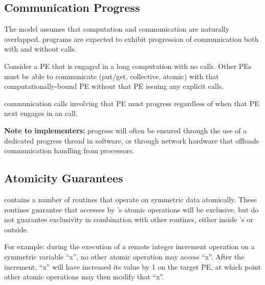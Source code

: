 \pagebreak

\subsection{Communication Progress}

The \openshmem model assumes that computation and communication are
naturally overlapped.  \openshmem programs are expected to exhibit
progression of communication both with and without \openshmem calls.

Consider a PE that is engaged in a long computation with no \openshmem calls.
Other PEs must be able to communicate (put/get,
collective, atomic) with that computationally-bound PE without that PE
issuing any explicit \openshmem calls.

\openshmem communication calls involving that PE must progress
regardless of when that PE next engages in an \openshmem call.

\textbf{Note to implementers:} progress will often be ensured through
the use of a dedicated progress thread in software, or through
network hardware that offloads communication handling from processors.

\subsection{Atomicity Guarantees}

\openshmem contains a number of routines that operate on symmetric data
atomically.  These routines guarantee that accesses by \openshmem's
atomic operations will be exclusive, but do not guarantee exclusivity
in combination with other routines, either inside \openshmem's or
outside.

For example: during the execution of a remote integer increment
operation on a symmetric variable ``x'', no other \openshmem atomic
operation may access ``x''.  After the increment, ``x'' will have
increased its value by 1 on the target PE, at which point other
atomic operations may then modify that ``x''.
